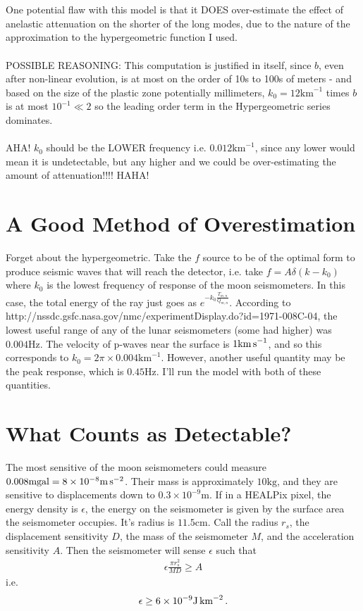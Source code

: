 \documentclass{article}
\newcommand*\te[1]{\text{#1}}
\newcommand*\f[2]{\frac{#1}{#2}}
\begin{document}
\\\\
One potential flaw with this model is that it DOES over-estimate the effect of anelastic attenuation on the shorter of the long modes, due to the nature of the approximation to the hypergeometric function I used.
\\\\
POSSIBLE REASONING: This computation is justified in itself, since $b$, even after non-linear evolution, is at most on the order of 10s to 100s of meters - and based on the size of the plastic zone potentially millimeters, $k_0 = 12\te{km}^{-1}$ times $b$ is at most $10^{-1}\ll 2$ so the leading order term in the Hypergeometric series dominates.
\\\\
AHA! $k_0$ should be the LOWER frequency i.e. $0.012\te{km}^{-1}$, since any lower would mean it is undetectable, but any higher and we could be over-estimating the amount of attenuation!!!! HAHA!
\pagebreak
\section{A Good Method of Overestimation}
Forget about the hypergeometric. Take the $f$ source to be of the optimal form to produce seismic waves that will reach the detector, i.e. take $f= A\delta(k-k_0)$ where $k_0$ is the lowest frequency of response of the moon seismometers. In this case, the total energy of the ray just goes as $e^{-k_0\f{T_{m,n}}{Q_{m,n}}}$. According to http://nssdc.gsfc.nasa.gov/nmc/experimentDisplay.do?id=1971-008C-04, the lowest useful range of any of the lunar seismometers (some had higher) was $0.004\te{Hz}$. The velocity of p-waves near the surface is $1\te{km\,s}^{-1}$, and so this corresponds to $k_0 = 2\pi\times 0.004\te{km}^{-1}$. However, another useful quantity may be the peak response, which is $0.45\te{Hz}$. I'll run the model with both of these quantities.
\pagebreak
\section{What Counts as Detectable?}
The most sensitive of the moon seismometers could measure $0.008\te{mgal}=8\times 10^{-8}\te{m\,s}^{-2}$. Their mass is approximately $10\te{kg}$, and they are sensitive to displacements down to $0.3\times 10^{-9}\te{m}$. If in a HEALPix pixel, the energy density is $\epsilon$, the energy on the seismometer is given by the surface area the seismometer occupies. It's radius is $11.5\te{cm}$. Call the radius $r_s$, the displacement sensitivity $D$, the mass of the seismometer $M$, and the acceleration sensitivity $A$. Then the seismometer will sense $\epsilon$ such that
\begin{align}
\epsilon\f{\pi r_s^2}{MD} \geq A
\end{align}
i.e.
\begin{align}
\epsilon \geq 6\times 10^{-9} \te{J\,km}^{-2}\,.
\end{align}
\pagebreak
\end{document}
